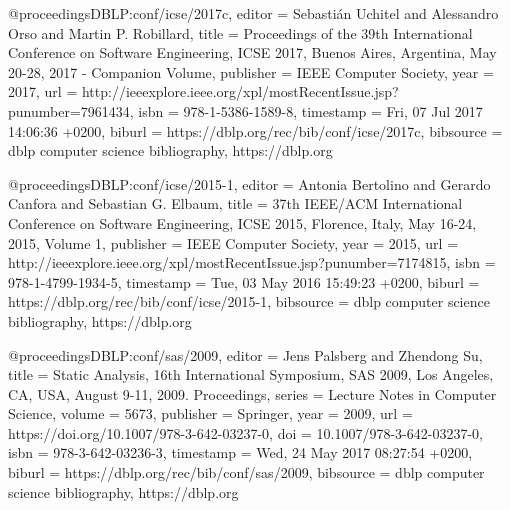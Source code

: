 @proceedings{DBLP:conf/icse/2017c,
  editor    = {Sebasti{\'{a}}n Uchitel and
               Alessandro Orso and
               Martin P. Robillard},
  title     = {Proceedings of the 39th International Conference on Software Engineering,
               {ICSE} 2017, Buenos Aires, Argentina, May 20-28, 2017 - Companion
               Volume},
  publisher = {{IEEE} Computer Society},
  year      = {2017},
  url       = {http://ieeexplore.ieee.org/xpl/mostRecentIssue.jsp?punumber=7961434},
  isbn      = {978-1-5386-1589-8},
  timestamp = {Fri, 07 Jul 2017 14:06:36 +0200},
  biburl    = {https://dblp.org/rec/bib/conf/icse/2017c},
  bibsource = {dblp computer science bibliography, https://dblp.org}
}

@proceedings{DBLP:conf/icse/2015-1,
  editor    = {Antonia Bertolino and
               Gerardo Canfora and
               Sebastian G. Elbaum},
  title     = {37th {IEEE/ACM} International Conference on Software Engineering,
               {ICSE} 2015, Florence, Italy, May 16-24, 2015, Volume 1},
  publisher = {{IEEE} Computer Society},
  year      = {2015},
  url       = {http://ieeexplore.ieee.org/xpl/mostRecentIssue.jsp?punumber=7174815},
  isbn      = {978-1-4799-1934-5},
  timestamp = {Tue, 03 May 2016 15:49:23 +0200},
  biburl    = {https://dblp.org/rec/bib/conf/icse/2015-1},
  bibsource = {dblp computer science bibliography, https://dblp.org}
}

@proceedings{DBLP:conf/sas/2009,
  editor    = {Jens Palsberg and
               Zhendong Su},
  title     = {Static Analysis, 16th International Symposium, {SAS} 2009, Los Angeles,
               CA, USA, August 9-11, 2009. Proceedings},
  series    = {Lecture Notes in Computer Science},
  volume    = {5673},
  publisher = {Springer},
  year      = {2009},
  url       = {https://doi.org/10.1007/978-3-642-03237-0},
  doi       = {10.1007/978-3-642-03237-0},
  isbn      = {978-3-642-03236-3},
  timestamp = {Wed, 24 May 2017 08:27:54 +0200},
  biburl    = {https://dblp.org/rec/bib/conf/sas/2009},
  bibsource = {dblp computer science bibliography, https://dblp.org}
}
